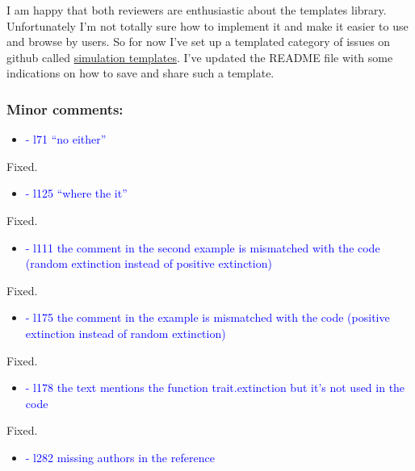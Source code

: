 \documentclass[
]{article}
\providecommand{\tightlist}{%
  \setlength{\itemsep}{0pt}\setlength{\parskip}{0pt}}
\begin{document}
I am happy that both reviewers are enthusiastic about the templates
library. Unfortunately I'm not totally sure how to implement it and make
it easier to use and browse by users. So for now I've set up a templated
category of issues on github called
\href{https://github.com/TGuillerme/treats/issues?q=is\%3Aopen+is\%3Aissue+label\%3A\%22simulation+template\%22}{simulation
templates}. I've updated the README file with some indications on how to
save and share such a template.

\hypertarget{minor-comments}{%
\subsubsection{Minor comments:}\label{minor-comments}}

\begin{itemize}
\tightlist
\item
  \textcolor{blue}{ - l71 ``no either'' }
\end{itemize}

Fixed.

\begin{itemize}
\tightlist
\item
  \textcolor{blue}{ - l125 ``where the it''}
\end{itemize}

Fixed.

\begin{itemize}
\tightlist
\item
  \textcolor{blue}{ - l111 the comment in the second example is mismatched with the code
  (random extinction instead of positive extinction)}
\end{itemize}

Fixed.

\begin{itemize}
\tightlist
\item
  \textcolor{blue}{ - l175 the comment in the example is mismatched with the code
  (positive extinction instead of random extinction)}
\end{itemize}

Fixed.

\begin{itemize}
\tightlist
\item
  \textcolor{blue}{ - l178 the text mentions the function trait.extinction but it's not
  used in the code}
\end{itemize}

Fixed.

\begin{itemize}
\tightlist
\item
  \textcolor{blue}{ - l282 missing authors in the reference}
\end{itemize}
\end{document}
